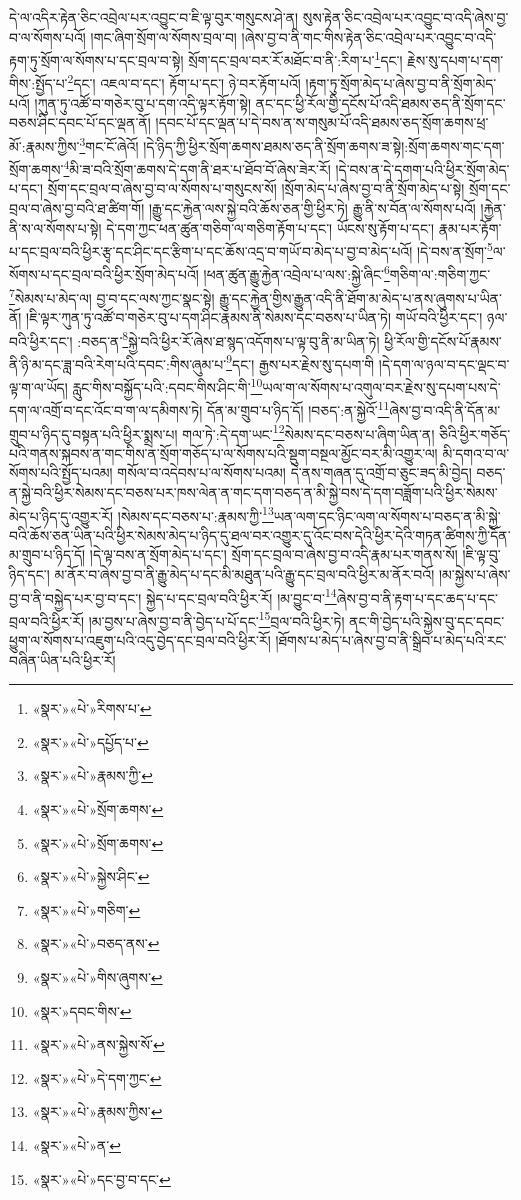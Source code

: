 དེ་ལ་འདིར་རྟེན་ཅིང་འབྲེལ་པར་འབྱུང་བ་ཇི་ལྟ་བུར་གསུངས་ཤེ་ན། སུས་རྟེན་ཅིང་འབྲེལ་པར་འབྱུང་བ་འདི་ཞེས་བྱ་བ་ལ་སོགས་པའོ། །གང་ཞིག་སྲོག་ལ་སོགས་བྲལ་བ། །ཞེས་བྱ་བ་ནི་གང་གིས་རྟེན་ཅིང་འབྲེལ་པར་འབྱུང་བ་འདི་རྟག་ཏུ་སྲོག་ལ་སོགས་པ་དང་བྲལ་བ་སྟེ། སྲོག་དང་བྲལ་བར་རོ་མཐོང་བ་ནི་:རིག་པ་\footnote{«སྣར་»«པེ་»རིགས་པ་}དང་། རྗེས་སུ་དཔག་པ་དག་གིས་:སྤྱོད་པ་\footnote{«སྣར་»«པེ་»དཔྱོད་པ་}དང་། འཇལ་བ་དང་། རྟོག་པ་དང་། ཉེ་བར་རྟོག་པའོ། །རྟག་ཏུ་སྲོག་མེད་པ་ཞེས་བྱ་བ་ནི་སྲོག་མེད་པའོ། །ཀུན་ཏུ་འཚོ་བ་གཅེར་བུ་པ་དག་འདི་ལྟར་རྟོག་སྟེ། ནང་དང་ཕྱི་རོལ་གྱི་དངོས་པོ་འདི་ཐམས་ཅད་ནི་སྲོག་དང་བཅས་ཤིང་དབང་པོ་དང་ལྡན་ནོ། །དབང་པོ་དང་ལྡན་པ་དེ་བས་ན་ས་གསུམ་པོ་འདི་ཐམས་ཅད་སྲོག་ཆགས་ཕྲ་མོ་:རྣམས་ཀྱིས་\footnote{«སྣར་»«པེ་»རྣམས་ཀྱི་}གང་ངོ་ཞེའོ། །དེ་ཉིད་ཀྱི་ཕྱིར་སྲོག་ཆགས་ཐམས་ཅད་ནི་སྲོག་ཆགས་ཟ་སྟེ།:སྲོག་ཆགས་གང་དག་སྲོག་ཆགས་\footnote{«སྣར་»«པེ་»སྲོག་ཆགས་}མི་ཟ་བའི་སྲོག་ཆགས་དེ་དག་ནི་ཐར་པ་ཐོབ་བོ་ཞེས་ཟེར་རོ། །དེ་བས་ན་དེ་དགག་པའི་ཕྱིར་སྲོག་མེད་པ་དང་། སྲོག་དང་བྲལ་བ་ཞེས་བྱ་བ་ལ་སོགས་པ་གསུངས་སོ། །སྲོག་མེད་པ་ཞེས་བྱ་བ་ནི་སྲོག་མེད་པ་སྟེ། སྲོག་དང་བྲལ་བ་ཞེས་བྱ་བའི་ཐ་ཚིག་གོ། །རྒྱུ་དང་རྐྱེན་ལས་སྐྱེ་བའི་ཆོས་ཅན་གྱི་ཕྱིར་ཏེ། རྒྱུ་ནི་ས་བོན་ལ་སོགས་པའོ། །རྐྱེན་ནི་ས་ལ་སོགས་པ་སྟེ། དེ་དག་ཀྱང་ཕན་ཚུན་གཅིག་ལ་གཅིག་རྟོག་པ་དང་། ཡོངས་སུ་རྟོག་པ་དང་། རྣམ་པར་རྟོག་པ་དང་བྲལ་བའི་ཕྱིར་རྩྭ་དང་ཤིང་དང་རྩིག་པ་དང་ཆོས་འདྲ་བ་གཡོ་བ་མེད་པ་བྱ་བ་མེད་པའོ། །དེ་བས་ན་སྲོག་\footnote{«སྣར་»«པེ་»སྲོག་ཆགས་}ལ་སོགས་པ་དང་བྲལ་བའི་ཕྱིར་སྲོག་མེད་པའོ། །ཕན་ཚུན་རྒྱུ་རྐྱེན་འབྲེལ་པ་ལས་:སྐྱེ་ཞིང་\footnote{«སྣར་»«པེ་»སྐྱེས་ཤིང་}གཅིག་ལ་:གཅིག་ཀྱང་\footnote{«སྣར་»«པེ་»གཅིག་}སེམས་པ་མེད་ལ། བྱ་བ་དང་ལས་ཀྱང་སྣང་སྟེ། རྒྱུ་དང་རྐྱེན་གྱིས་རྒྱུན་འདི་ནི་ཐོག་མ་མེད་པ་ནས་ཞུགས་པ་ཡིན་ནོ། །ཇི་ལྟར་ཀུན་ཏུ་འཚོ་བ་གཅེར་བུ་པ་དག་ཤིང་རྣམས་ནི་སེམས་དང་བཅས་པ་ཡིན་ཏེ། གཡོ་བའི་ཕྱིར་དང་། ཉལ་བའི་ཕྱིར་དང་། :བཅད་ན་\footnote{«སྣར་»«པེ་»བཅད་ནས་}སྐྱེ་བའི་ཕྱིར་རོ་ཞེས་ཐ་སྙད་འདོགས་པ་ལྟ་བུ་ནི་མ་ཡིན་ཏེ། ཕྱི་རོལ་གྱི་དངོས་པོ་རྣམས་ནི་ཉི་མ་དང་ཟླ་བའི་རེག་པའི་དབང་:གིས་ཞུམ་པ་\footnote{«སྣར་»«པེ་»གིས་ཞུགས་}དང་། རྒྱས་པར་རྗེས་སུ་དཔག་གི །དེ་དག་ལ་ཉལ་བ་དང་ལྡང་བ་ལྟ་ག་ལ་ཡོད། རླུང་གིས་བསྐྱོད་པའི་:དབང་གིས་ཤིང་གི་\footnote{«སྣར་»དབང་གིས་}ཡལ་ག་ལ་སོགས་པ་འགུལ་བར་རྗེས་སུ་དཔག་པས་དེ་དག་ལ་འགྲོ་བ་དང་འོང་བ་ག་ལ་དམིགས་ཏེ། དོན་མ་གྲུབ་པ་ཉིད་དོ། །བཅད་:ན་སྐྱེའོ་\footnote{«སྣར་»«པེ་»ནས་སྐྱེས་སོ་}ཞེས་བྱ་བ་འདི་ནི་དོན་མ་གྲུབ་པ་ཉིད་དུ་བསྟན་པའི་ཕྱིར་སྨྲས་པ། གལ་ཏེ་:དེ་དག་ཡང་\footnote{«སྣར་»«པེ་»དེ་དག་ཀྱང་}སེམས་དང་བཅས་པ་ཞིག་ཡིན་ན། ཅིའི་ཕྱིར་གཅོད་པའི་གནས་སྐབས་ན་གང་གིས་ན་སྲོག་གཅོད་པ་ལ་སོགས་པའི་སྡུག་བསྔལ་མྱོང་བར་མི་འགྱུར་ལ། མི་དགའ་བ་ལ་སོགས་པའི་སྤྱོད་པའམ། གསོལ་བ་འདེབས་པ་ལ་སོགས་པའམ། དེ་ནས་གཞན་དུ་འགྲོ་བ་ཅུང་ཟད་མི་བྱེད། བཅད་ན་སྐྱེ་བའི་ཕྱིར་སེམས་དང་བཅས་པར་ཁས་ལེན་ན་གང་དག་བཅད་ན་མི་སྐྱེ་བས་དེ་དག་བཟློག་པའི་ཕྱིར་སེམས་མེད་པ་ཉིད་དུ་འགྱུར་རོ། །སེམས་དང་བཅས་པ་:རྣམས་ཀྱི་\footnote{«སྣར་»«པེ་»རྣམས་ཀྱིས་}ཡན་ལག་དང་ཉིང་ལག་ལ་སོགས་པ་བཅད་ན་མི་སྐྱེ་བའི་ཆོས་ཅན་ཡིན་པའི་ཕྱིར་སེམས་མེད་པ་ཉིད་དུ་ཐལ་བར་འགྱུར་དུ་འོང་བས་དེའི་ཕྱིར་དེའི་གཏན་ཚིགས་ཀྱི་དོན་མ་གྲུབ་པ་ཉིད་དོ། །དེ་ལྟ་བས་ན་སྲོག་མེད་པ་དང་། སྲོག་དང་བྲལ་བ་ཞེས་བྱ་བ་འདི་རྣམ་པར་གནས་སོ། །ཇི་ལྟ་བུ་ཉིད་དང་། མ་ནོར་བ་ཞེས་བྱ་བ་ནི་རྒྱུ་མེད་པ་དང་མི་མཐུན་པའི་རྒྱུ་དང་བྲལ་བའི་ཕྱིར་མ་ནོར་བའོ། །མ་སྐྱེས་པ་ཞེས་བྱ་བ་ནི་བསྐྱེད་པར་བྱ་བ་དང་། སྐྱེད་པ་དང་བྲལ་བའི་ཕྱིར་རོ། །མ་བྱུང་བ་\footnote{«སྣར་»«པེ་»ན་}ཞེས་བྱ་བ་ནི་རྟག་པ་དང་ཆད་པ་དང་བྲལ་བའི་ཕྱིར་རོ། །མ་བྱས་པ་ཞེས་བྱ་བ་ནི་བྱེད་པ་པོ་དང་\footnote{«སྣར་»«པེ་»དང་བྱ་བ་དང་}བྲལ་བའི་ཕྱིར་ཏེ། ནང་གི་བྱེད་པའི་སྐྱེས་བུ་དང་དབང་ཕྱུག་ལ་སོགས་པ་འཇུག་པའི་འདུ་བྱེད་དང་བྲལ་བའི་ཕྱིར་རོ། །ཐོགས་པ་མེད་པ་ཞེས་བྱ་བ་ནི་སྒྲིབ་པ་མེད་པའི་རང་བཞིན་ཡིན་པའི་ཕྱིར་རོ། 